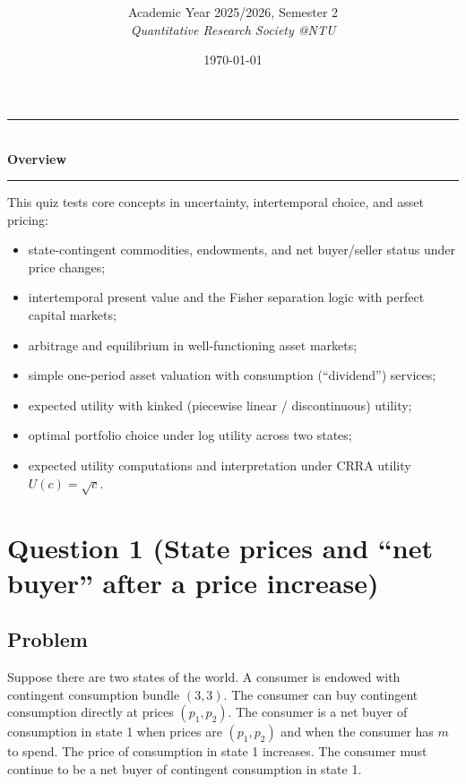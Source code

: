 \documentclass[12pt]{article}
\title{
\CourseCode \CourseName \\[0.3em]
\large \DocType
}
\author{
  Academic Year 2025/2026, Semester 2 \\[0.25em]
  \textit{Quantitative Research Society @NTU}
}
\date{\today}
\begin{document}
\maketitle
\thispagestyle{plainfirst}
\pagestyle{main}
\bigskip

\begin{center}
  \rule{0.8\textwidth}{0.4pt}\\[4pt]
  \textbf{Overview}\\[2pt]
  \rule{0.8\textwidth}{0.4pt}
\end{center}

\noindent
This quiz tests core concepts in uncertainty, intertemporal choice, and asset pricing:
\begin{itemize}[leftmargin=*]
  \item state-contingent commodities, endowments, and net buyer/seller status under price changes;
  \item intertemporal present value and the Fisher separation logic with perfect capital markets;
  \item arbitrage and equilibrium in well-functioning asset markets;
  \item simple one-period asset valuation with consumption (``dividend'') services;
  \item expected utility with kinked (piecewise linear / discontinuous) utility;
  \item optimal portfolio choice under log utility across two states;
  \item expected utility computations and interpretation under CRRA utility \(U(c)=\sqrt{c}\).
\end{itemize}

\bigskip

\newpage
\section*{Question 1 (State prices and ``net buyer'' after a price increase)}
\subsection*{Problem}
Suppose there are two states of the world. A consumer is endowed with contingent consumption bundle \((3,3)\).
The consumer can buy contingent consumption directly at prices \((p_1,p_2)\).
The consumer is a net buyer of consumption in state 1 when prices are \((p_1,p_2)\) and when the consumer has \(m\) to spend.
The price of consumption in state 1 increases. The consumer must continue to be a net buyer of contingent consumption in state 1.
\end{document}
